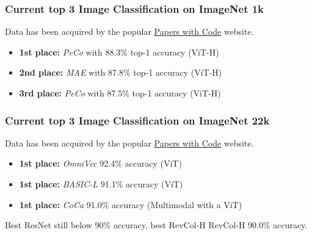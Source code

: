 \begin{frame}
\begin{frame}
\end{frame}


\begin{frame}
\frametitle{Current top 3 Image Classification on ImageNet 1k}
Data has been acquired by the popular \href{https://paperswithcode.com/sota/image-classification-on-imagenet?tag_filter=171}{Papers with Code} website.


\begin{itemize}
    \item \textbf{1st place:} \textit{PeCo} with 88.3\% top-1 accuracy (ViT-H)
    \item \textbf{2nd place:} \textit{MAE} with 87.8\% top-1 accuracy (ViT-H)
    \item \textbf{3rd place:} \textit{PeCo} with 87.5\% top-1 accuracy (ViT-H)
\end{itemize}

\end{frame}

\begin{frame}
\frametitle{Current top 3 Image Classification on ImageNet 22k}
Data has been acquired by the popular \href{https://paperswithcode.com/sota/image-classification-on-imagenet}{Papers with Code} website.


\begin{itemize}
    \item \textbf{1st place:} \textit{OmniVec} 92.4\% accuracy (ViT)
    \item \textbf{1st place:} \textit{BASIC-L} 91.1\% accuracy (ViT)
    \item \textbf{1st place:} \textit{CoCa} 91.0\% accuracy (Multimodal with a ViT)
\end{itemize}

Best ResNet still below 90\% accuracy, best RevCol-H RevCol-H 90.0\% accuracy.

\end{frame}